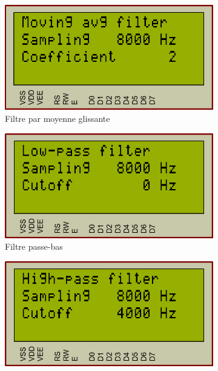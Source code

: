 \documentclass{article}
\begin{document}
    \begin{figure}[H]
        \centering
        \begin{subfigure}[b]{0.34\textwidth}
            \centering
            \includegraphics[width=.9\textwidth]{./images/vue_mov_avg.png}
            \caption{Filtre par moyenne glissante}
        \end{subfigure}
        \begin{subfigure}[b]{0.34\textwidth}
            \centering
            \includegraphics[width=.9\textwidth]{./images/vue_low_pass.png}
            \caption{Filtre passe-bas}
        \end{subfigure}
        \begin{subfigure}[b]{0.34\textwidth}
            \centering
            \includegraphics[width=.9\textwidth]{./images/vue_high_pass.png}

\end{subfigure}
\end{figure}
\end{document}
